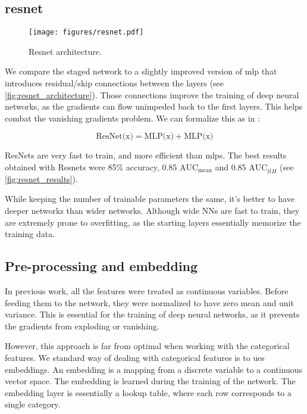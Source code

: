 \subsection[resnet]{\gls{resnet}}

\begin{figure}[htbp]
    \centering
    \texttt{[image: figures/resnet.pdf]}
    \caption{Resnet architecture.}
    \label{fig:resnet_architecture}
\end{figure}

We compare the staged network to a slightly improved version of \gls{mlp} that introduces residual/skip
connections between the layers (see \autoref{fig:resnet_architecture}).
Those connections improve the training of deep neural networks, as the gradients can flow unimpeded back to the first
layers. This helps combat the vanishing gradients problem. We can formalize this as in
\cite{ft-transformer}:

$$
    \text{ResNet(x)} = \text{MLP(x)} + \text{MLP(x)}
$$

ResNets are very fast to train, and more efficient than mlps. The best results obtained with Resnets were 85\% accuracy,
0.85 $\text{AUC}_\text{mean}$ and 0.85 $\text{AUC}_{t\bar{t}H}$ (see \autoref{fig:resnet_results}).

While keeping the number of trainable parameters the same, it's better to have deeper networks than wider networks.
Although wide NNs are fast to train, they are extremely prone to overfitting, as the starting layers essentially
memorize the training data.


\subsection{Pre-processing and embedding}

In previous work, all the features were treated as continuous variables. Before feeding them to the network, they were
normalized to have zero mean and unit variance. This is essential for the training of deep neural networks, as it
prevents the gradients from exploding or vanishing.

However, this approach is far from optimal when working with the categorical features. We standard way of dealing with
categorical features is to ues embeddings. An embedding is a mapping from a discrete variable to a continuous vector
space. The embedding is learned during the training of the network. The embedding layer is essentially a lookup table,
where each row corresponds to a single category.

